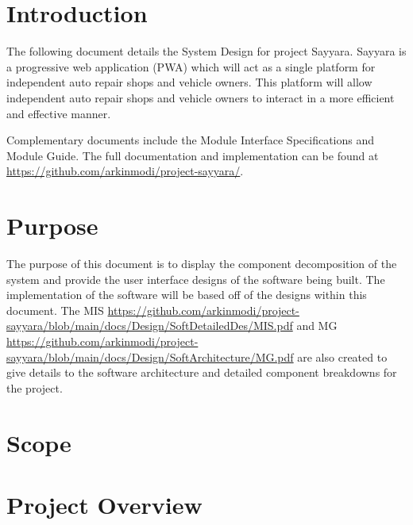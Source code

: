 \documentclass[12pt, titlepage]{article}
\begin{document}
\newpage

\tableofcontents

\newpage

\listoftables

\listoffigures

\newpage


\section{Introduction}

The following document details the System Design for project Sayyara. Sayyara is a progressive web
application (PWA) which will act as a single platform for independent auto repair shops and vehicle
owners. This platform will allow independent auto repair shops and vehicle owners to interact in a
more efficient and effective manner.

Complementary documents include the Module Interface Specifications and Module Guide. The full
documentation and implementation can be found at
\url{https://github.com/arkinmodi/project-sayyara/}.

\section{Purpose}

The purpose of this document is to display the component decomposition of the system and provide
the user interface designs of the software being built. The implementation of the software will be
based off of the designs within this document. The MIS
\url{https://github.com/arkinmodi/project-sayyara/blob/main/docs/Design/SoftDetailedDes/MIS.pdf}
and MG
\url{https://github.com/arkinmodi/project-sayyara/blob/main/docs/Design/SoftArchitecture/MG.pdf}
are also created to give details to the software architecture and detailed component breakdowns for
the project.

\section{Scope}


\section{Project Overview}
\end{document}
